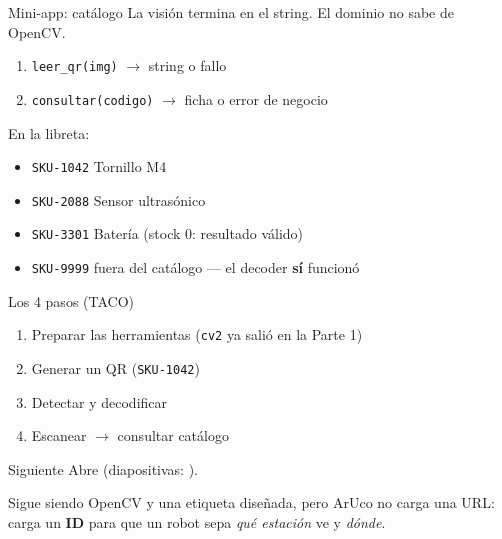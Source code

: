 \documentclass[aspectratio=169]{beamer}
\begin{document}
\begin{frame}{Mini-app: catálogo}
  La visión termina en el string. El dominio no sabe de OpenCV.

  \begin{enumerate}
    \item \texttt{leer\_qr(img)} $\to$ string o fallo
    \item \texttt{consultar(codigo)} $\to$ ficha o error de negocio
  \end{enumerate}

  En la libreta:
  \begin{itemize}
    \item \texttt{SKU-1042} Tornillo M4
    \item \texttt{SKU-2088} Sensor ultrasónico
    \item \texttt{SKU-3301} Batería (stock 0: resultado válido)
    \item \texttt{SKU-9999} fuera del catálogo --- el decoder \textbf{sí} funcionó
  \end{itemize}
\end{frame}

\begin{frame}{Los 4 pasos (TACO)}
  \begin{enumerate}
    \item Preparar las herramientas (\texttt{cv2} ya salió en la Parte 1)
    \item Generar un QR (\texttt{SKU-1042})
    \item Detectar y decodificar
    \item Escanear $\to$ consultar catálogo
  \end{enumerate}
\end{frame}

\begin{frame}{Siguiente}
  Abre  (diapositivas: ).

  Sigue siendo OpenCV y una etiqueta diseñada, pero ArUco no carga una URL: carga un \textbf{ID} para que un robot sepa \emph{qué estación} ve y \emph{dónde}.
\end{frame}
\end{document}
